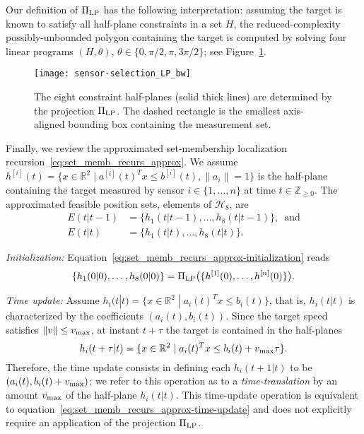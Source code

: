 \documentclass[onecolumn,journal,letterpaper]{IEEEtran}
\newcommand{\integernonnegative}{{\mathbb{Z}_{\geq0}}}
\newcommand{\real}{{\mathbb{R}}}
\newcommand{\subscr}[2]{{#1}_{\textup{#2}}}
\newcommand{\setdef}[2]{\{#1 \; | \; #2\}}
\newcommand{\norm}[1]{\|#1\|}
\newcommand{\until}[1]{\{1,\dots,#1\}}
\newcommand{\HH}{\mathcal{H}}
\newcommand{\supind}[2]{{#1}^{[#2]}}
\newcommand{\subind}[2]{{#1}_{#2}}
\newcommand{\PiLP}{\Pi_{\textup{LP}}}
\begin{document}
Our definition of $\PiLP$ has the following interpretation: assuming the
target is known to satisfy all half-plane constraints in a set $H$, the
reduced-complexity possibly-unbounded polygon containing the target is
computed by solving four linear programs $(H,\theta)$, $\theta \in \{0,
\pi/2, \pi, 3\pi/2\}$; see
Figure~\ref{fig:target-localization-bounding-rectangle}.


\begin{figure}[h]
\begin{center}
  \texttt{[image: sensor-selection\_LP\_bw]}\caption{The eight constraint half-planes (solid thick lines) are
    determined by the projection $\PiLP$. The dashed rectangle is the
    smallest axis-aligned bounding box containing the measurement set.}
  \label{fig:target-localization-bounding-rectangle}
\end{center}
\end{figure}

Finally, we review the approximated set-membership localization
recursion~\eqref{eq:set_memb_recurs_approx}.  We assume $\supind{h}{i}(t) =
\setdef{x\in\real^2}{\supind{a}{i}(t)^Tx\leq\supind{b}{i}(t),
  \norm{a_i}{}=1}$ is the half-plane containing the target measured by
sensor $i\in\until{n}$ at time $t\in\integernonnegative$.  The approximated
feasible position sets, elements of $\HH_8$, are
\begin{align*}
  {E}(t|t-1) &= \{  {h}_1(t|t-1),\dots,{h}_8(t|t-1)   \},
  \enspace \text{and}
  \\
  {E}(t|t)  &= \{  {h}_1(t|t),\dots,{h}_8(t|t)   \}.
\end{align*}

\smallskip
\noindent\emph{Initialization:}
Equation~\eqref{eq:set_memb_recurs_approx-initialization} reads
\begin{equation*}
  \{h_1(0|0),\dots,h_8(0|0)\}  = \PiLP\big(
  \{\supind{h}{1}(0),\dots,\supind{h}{n}(0)\} \big).
\end{equation*}

\smallskip
\noindent\emph{Time update:}
Assume $h_i(t|t) = \setdef{x\in\real^2}{\subind{a}{i}(t)^T
  x\leq\subind{b}{i}(t)}$, that is, $h_i(t|t)$ is characterized by the
coefficients $(\subind{a}{i}(t),\subind{b}{i}(t))$.  Since the target speed
satisfies $\norm{v}{}\leq\subscr{v}{max}$, at instant $t+\tau$ the target
is contained in the half-planes
\[
h_i(t+\tau|t) = \setdef{x\in\real^2}{\subind{a}{i}(t)^T
  x\leq\subind{b}{i}(t) + \subscr{v}{max} \tau}.
\]
Therefore, the time update consists in defining each $h_i(t+1|t)$ to be
$(\subind{a}{i}(t),\subind{b}{i}(t)+\subscr{v}{max})$; we refer to this
operation as to a \emph{time-translation} by an amount $\subscr{v}{max}$ of
the half-plane $h_i(t|t)$.  This time-update operation is equivalent to
equation~\eqref{eq:set_memb_recurs_approx-time-update} and does not
explicitly require an application of the projection $\PiLP$.
\end{document}
